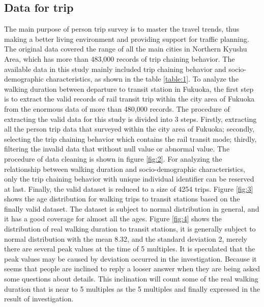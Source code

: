 \documentclass[Journal,letterpaper]{ascelike-new}
\begin{document}
\subsection{Data for trip}
The main purpose of person trip survey is to master the travel trends, thus making a better living environment and providing support for traffic planning. The original data covered the range of all the main cities in Northern Kyushu Area, which has more than 483,000 records of trip chaining behavior. The available data in this study mainly included trip chaining behavior and socio-demographic characteristics, as shown in the table \ref{table:1}.
%
To analyze the walking duration between departure to transit station in Fukuoka, the first step is to extract the valid records of rail transit trip within the city area of Fukuoka from the enormous data of more than 480,000 records. The procedure of extracting the valid data for this study is divided into 3 steps. Firstly, extracting all the person trip data that surveyed within the city area of Fukuoka; secondly, selecting the trip chaining behavior which contains the rail transit mode; thirdly, filtering the invalid data that without null value or abnormal value. The procedure of data cleaning is shown in figure \ref{fig:2}. For analyzing the relationship between walking duration and socio-demographic characteristics, only the trip chaining behavior with unique individual identifier can be reserved at last. Finally, the valid dataset is reduced to a size of 4254 trips.
%
Figure \ref{fig:3} shows the age distribution for walking trips to transit stations based on the finally valid dataset. The dataset is subject to normal distribution in general, and it has a good coverage for almost all the ages. Figure \ref{fig:4} shows the distribution of real walking duration to transit stations, it is generally subject to normal distribution with the mean 8.32, and the standard deviation 2, merely there are several peak values at the time of 5 multiples. It is speculated that the peak values may be caused by deviation occurred in the investigation. Because it seems that people are inclined to reply a looser answer when they are being asked some questions about details. This inclination will count some of the real walking duration that is near to 5 multiples as the 5 multiples and finally expressed in the result of investigation.
%
\end{document}
